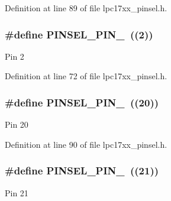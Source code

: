 Definition at line 89 of file lpc17xx\+\_\+pinsel.\+h.

\subsubsection[{\texorpdfstring{P\+I\+N\+S\+E\+L\+\_\+\+P\+I\+N\+\_\+2}{PINSEL_PIN_2}}]{\setlength{\rightskip}{0pt plus 5cm}\#define P\+I\+N\+S\+E\+L\+\_\+\+P\+I\+N\+\_~((2))}\hypertarget{group___p_i_n_s_e_l___public___macros_ga9d1834ec06bf0543870697aff2019b9f}{}\label{group___p_i_n_s_e_l___public___macros_ga9d1834ec06bf0543870697aff2019b9f}
Pin 2 

Definition at line 72 of file lpc17xx\+\_\+pinsel.\+h.

\subsubsection[{\texorpdfstring{P\+I\+N\+S\+E\+L\+\_\+\+P\+I\+N\+\_\+20}{PINSEL_PIN_20}}]{\setlength{\rightskip}{0pt plus 5cm}\#define P\+I\+N\+S\+E\+L\+\_\+\+P\+I\+N\+\_~((20))}\hypertarget{group___p_i_n_s_e_l___public___macros_gaf6f10e74df1a1bbcb6ef73ba610cc129}{}\label{group___p_i_n_s_e_l___public___macros_gaf6f10e74df1a1bbcb6ef73ba610cc129}
Pin 20 

Definition at line 90 of file lpc17xx\+\_\+pinsel.\+h.

\subsubsection[{\texorpdfstring{P\+I\+N\+S\+E\+L\+\_\+\+P\+I\+N\+\_\+21}{PINSEL_PIN_21}}]{\setlength{\rightskip}{0pt plus 5cm}\#define P\+I\+N\+S\+E\+L\+\_\+\+P\+I\+N\+\_~((21))}\hypertarget{group___p_i_n_s_e_l___public___macros_ga1708e4ff4379303c85280efcbcfeeacf}{}\label{group___p_i_n_s_e_l___public___macros_ga1708e4ff4379303c85280efcbcfeeacf}
Pin 21 

